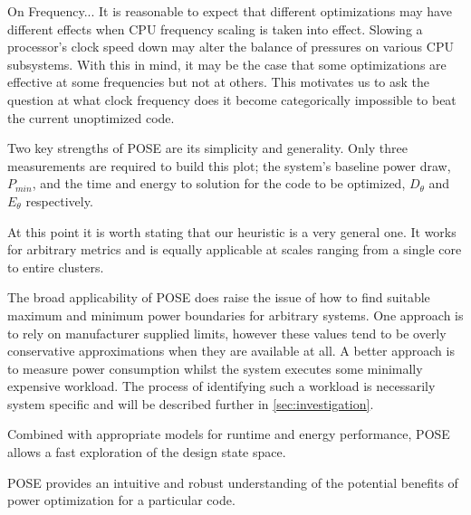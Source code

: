 


On Frequency...
It is reasonable to expect that different optimizations may have different effects when CPU frequency scaling is taken into effect. Slowing a processor's clock speed down may alter the balance of pressures on various CPU subsystems. With this in mind, it may be the case that some optimizations are effective at some frequencies but not at others. This motivates us to ask the question at what clock frequency does it become categorically impossible to beat the current unoptimized code.

\todo{} Two key strengths of POSE are its simplicity and generality.
Only three measurements are required to build this plot; the system's baseline power draw, $P_{min}$, and the time and energy to solution for the code to be optimized, $D_\theta$ and $E_\theta$ respectively.



\todo{} At this point it is worth stating that our heuristic is a very general one.
It works for arbitrary metrics and is equally applicable at scales ranging from a single core to entire clusters.


The broad applicability of POSE does raise the issue of how to find suitable maximum and minimum power boundaries for arbitrary systems. 
One approach is to rely on manufacturer supplied limits, however these values tend to be overly conservative approximations when they are available at all.
A better approach is to measure power consumption whilst the system executes some minimally expensive workload. 
The process of identifying such a workload is necessarily system specific and will be described further in \autoref{sec:investigation}.

Combined with appropriate models for runtime and energy performance, POSE allows a fast exploration of the design state space.


POSE provides an intuitive and robust understanding of the potential benefits of power optimization for a particular code. 